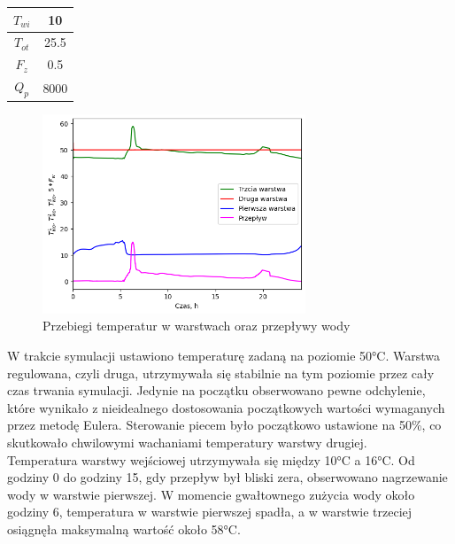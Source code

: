 \documentclass[a4paper,twoside,12pt]{book}
\begin{document}
\begin{table}[!h]
\begin{tabular}{|c|ccc|}
    $T_{wi}$                                                    & \multicolumn{3}{c|}{10}                                              \\ \hline
    $T_{ot}$                                                    & \multicolumn{3}{c|}{25.5}                                            \\ \hline
    $F_z$                                                       & \multicolumn{3}{c|}{0.5}                                             \\ \hline
    $Q_p$                                                       & \multicolumn{3}{c|}{8000}                                            \\ \hline
  \end{tabular}
\end{table}

\newpage
\begin{figure}[!h]
  \centering
  \includegraphics[width=0.7\textwidth]{img/Przebiegi.png}
  \caption{Przebiegi temperatur w warstwach oraz przepływy wody}
  \label{fig:etykieta-rysunku}
\end{figure}
W trakcie symulacji ustawiono temperaturę zadaną na poziomie 50°C. Warstwa regulowana, czyli druga, utrzymywała się stabilnie na tym poziomie przez cały czas trwania symulacji. Jedynie na początku obserwowano pewne odchylenie, które wynikało z nieidealnego dostosowania początkowych wartości wymaganych przez metodę Eulera. Sterowanie piecem było początkowo ustawione na 50\%, co skutkowało chwilowymi wachaniami temperatury warstwy drugiej.\\

Temperatura warstwy wejściowej utrzymywała się między 10°C a 16°C. Od godziny 0 do godziny 15, gdy przepływ był bliski zera, obserwowano nagrzewanie wody w warstwie pierwszej. W momencie gwałtownego zużycia wody około godziny 6, temperatura w warstwie pierwszej spadła, a w warstwie trzeciej osiągnęła maksymalną wartość około 58°C.\\
\end{document}
